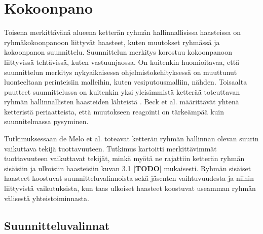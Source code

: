 \chapter{Kokoonpano}

Toisena merkittävänä alueena ketterän ryhmän hallinnallisissa haasteissa on ryhmäkokoonpanoon liittyvät haasteet, kuten muutokset ryhmässä ja kokoonpanon suunnittelu. Suunnittelun merkitys korostuu kokoonpanoon liittyvissä tehtävissä, kuten vastuunjaossa. On kuitenkin huomioitavaa, että suunnittelun merkitys nykyaikaisessa ohjelmistokehityksessä on muuttunut luonteeltaan perinteisiin malleihin, kuten vesiputousmalliin, nähden. Toisaalta puutteet suunnittelussa on kuitenkin yksi yleisimmistä ketterää toteuttavan ryhmän hallinnallisten haasteiden lähteistä \cite{7872736}. Beck et al. \cite{beck2001agile} määrittävät yhtenä ketteristä periaatteista, että muutokseen reagointi on tärkeämpää kuin suunnitelmassa pysyminen.

Tutkimuksessaan de Melo et al. \cite{DEOMELO2013412} toteavat ketterän ryhmän hallinnan olevan suurin vaikuttava tekijä tuottavuuteen. Tutkimus kartoitti merkittävimmät tuottavuuteen vaikuttavat tekijät, minkä myötä ne rajattiin ketterän ryhmän sisäisiin ja ulkoisiin haasteisiin kuvan 3.1 [\textbf{TODO}] mukaisesti. Ryhmän sisäiset haasteet koostuvat suunnitteluvalinnoista sekä jäsenten vaihtuvuudesta ja niihin liittyvistä vaikutuksista, kun taas ulkoiset haasteet koostuvat useamman ryhmän välisestä yhteistoiminnasta.


\section{Suunnitteluvalinnat}

